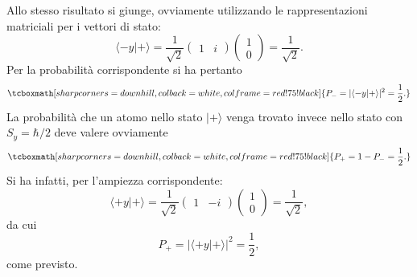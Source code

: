 \documentclass[a4paper,12pt,oneside]{book}
\begin{document}
Allo stesso risultato si giunge, ovviamente utilizzando le rappresentazioni matriciali per i vettori di stato:
	\begin{equation}
		\langle -y | + \rangle= \frac{1}{\sqrt{2}}
		\begin{pmatrix}
		1 & i
		\end{pmatrix}
		\begin{pmatrix}
		1 \\
		0
		\end{pmatrix}=
		\frac{1}{\sqrt{2}} .
	\end{equation}
Per la probabilità corrispondente si ha pertanto
	\begin{equation}
		\tcboxmath[sharp corners=downhill ,colback=white,colframe=red!75!black]{
			P_-= |\langle -y | + \rangle |^2=\frac{1}{2} .
			}
	\end{equation}
La probabilità che un atomo nello stato $| + \rangle $  venga trovato invece nello stato con $S_y=\hbar/2$ deve valere ovviamente
	\begin{equation}
		\tcboxmath[sharp corners=downhill ,colback=white,colframe=red!75!black]{
			P_+= 1-P_-=\frac{1}{2} .
			}
	\end{equation}
Si ha infatti, per l'ampiezza corrispondente:
	\begin{equation}
		\langle +y | + \rangle = \frac{1}{\sqrt{2}}
		\begin{pmatrix}
		1 & -i
		\end{pmatrix}
		\begin{pmatrix}
		1 \\
		0
		\end{pmatrix}=
		\frac{1}{\sqrt{2}} ,
	\end{equation}
da cui
	\begin{equation}
		P_+= |\langle +y | + \rangle |^2=\frac{1}{2} ,
		\end{equation}
come previsto.\\
\end{document}
